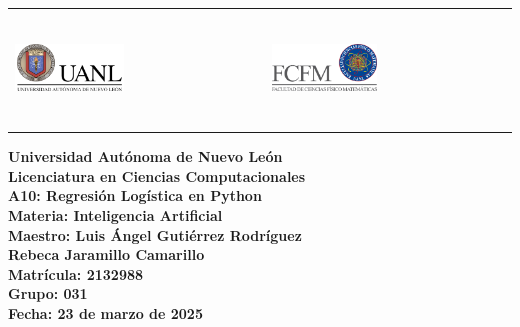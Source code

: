 \documentclass{article}
\begin{document}
\begin{titlepage}
    
    \noindent %
    \begin{tabular}{@{}p{} p{}@{}}
        \includegraphics[height=3cm, width=0.45\textwidth, keepaspectratio]{logos/uanl.png} & %
        \hfill \includegraphics[height=3cm, width=0.45\textwidth, keepaspectratio]{logos/fcfm.png} %
    \end{tabular}
    
    \begin{center}
        \vspace*{2cm} %
        \textbf{\Large Universidad Autónoma de Nuevo León} \\[2cm]
        
        \textbf{\Large Licenciatura en Ciencias Computacionales} \\[2cm]
        
        \textbf{\Large A10: Regresión Logística en Python} \\[2cm]
    
        \textbf{\large Materia: Inteligencia Artificial} \\[.5cm]
        \textbf{\large Maestro: Luis Ángel Gutiérrez Rodríguez} \\[2cm]
        
        \textbf{\large Rebeca Jaramillo Camarillo} \\[.5cm]
        \textbf{\large Matrícula: 2132988} \\[.5cm]
        \textbf{\large Grupo: 031} \\
        
        \vfill %
        \textbf{\large Fecha: 23 de marzo de 2025} %
    \end{center}
	
\end{titlepage}
\end{document}

